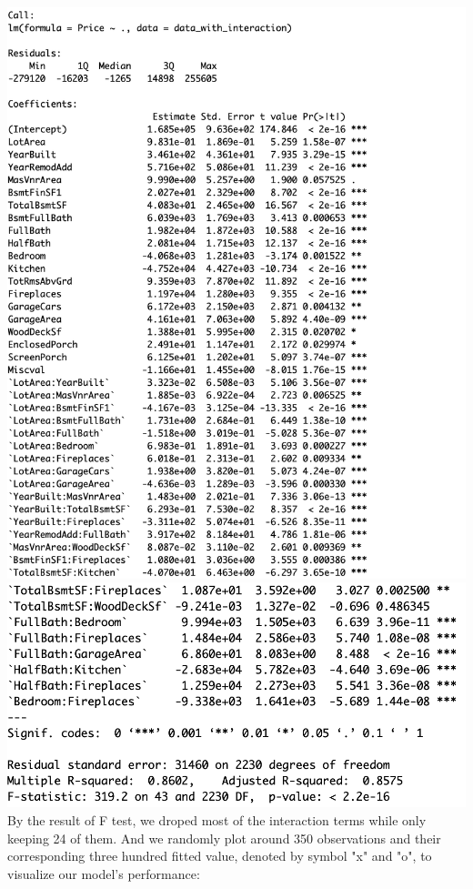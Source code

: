 \documentclass{article}
\begin{document}
\includegraphics[scale = 0.5]{reg_f1.png}\\
\includegraphics[scale = 0.5]{reg_f2.png}\\
By the result of F test, we droped most of the interaction terms while only keeping 24 of them. And we randomly plot around 350 observations and their corresponding three hundred fitted value, denoted by symbol "x" and "o", to visualize our model's performance:\\
\end{document}
